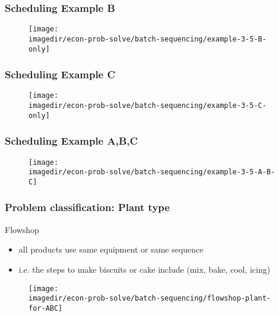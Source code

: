 \begin{frame}\frametitle{Scheduling Example B}
	\begin{figure}
		[!htb] 
		\begin{center}
			\texttt{[image: \\imagedir/econ-prob-solve/batch-sequencing/example-3-5-B-only]}
			
			\label{fig:Eg5} 
		\end{center}
	\end{figure}
\end{frame}

\begin{frame}\frametitle{Scheduling Example C}
	\begin{figure}
		[!htb] 
		\begin{center}
			\texttt{[image: \\imagedir/econ-prob-solve/batch-sequencing/example-3-5-C-only]}
			
			\label{fig:Eg5} 
		\end{center}
	\end{figure}
\end{frame}

\begin{frame}\frametitle{Scheduling Example A,B,C}
	\begin{figure}
		[!htb] 
		\begin{center}
			\texttt{[image: \\imagedir/econ-prob-solve/batch-sequencing/example-3-5-A-B-C]}
			
			\label{fig:Eg5} 
		\end{center}
	\end{figure}
\end{frame}

\begin{frame}\frametitle{Problem classification: Plant type}
	
	{\color{purple}Flowshop}
	\begin{itemize}
		\item	all products use same equipment or same sequence 
		\item	i.e. the steps to make biscuits or cake include (mix, bake, cool, icing) 
	\end{itemize}
	\begin{figure}
		[!htb] 
		\begin{center}
			\texttt{[image: \\imagedir/econ-prob-solve/batch-sequencing/flowshop-plant-for-ABC]}
			
			\label{fig:flow} 
		\end{center}
	\end{figure}
\end{frame}

